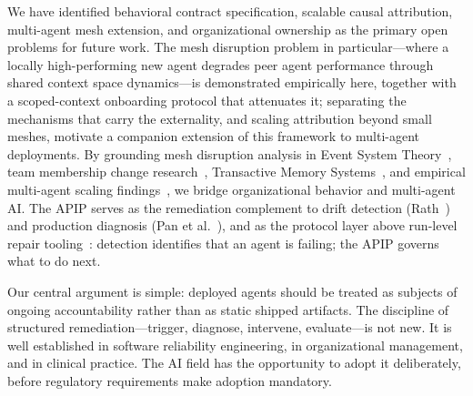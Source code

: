 \documentclass[conference]{IEEEtran}
\begin{document}
We have identified behavioral contract specification, scalable causal
attribution, multi-agent mesh extension, and organizational ownership as the
primary open problems for future work. The mesh disruption problem in
particular---where a locally high-performing new agent degrades peer agent
performance through shared context space dynamics---is demonstrated
empirically here, together with a scoped-context onboarding protocol that
attenuates it; separating the mechanisms that carry the externality, and
scaling attribution beyond small meshes, motivate a companion extension of
this framework to multi-agent deployments. By grounding mesh disruption
analysis in Event
System Theory~\cite{morgeson2015event}, team membership change
research~\cite{summers2012team,trainer2020membership}, Transactive Memory
Systems~\cite{ren2011transactive,wegner1987transactive}, and empirical
multi-agent scaling findings~\cite{kim2025scaling}, we bridge organizational
behavior and multi-agent AI. The APIP serves as the remediation complement to
drift detection (Rath~\cite{rath2026drift}) and production diagnosis (Pan et
al.~\cite{pan2025measuring}), and as the protocol layer above run-level repair
tooling~\cite{zhu2026agentdebugx}: detection identifies that an agent is
failing; the APIP governs what to do next.

Our central argument is simple: deployed agents should be treated as subjects
of ongoing accountability rather than as static shipped artifacts. The
discipline of structured remediation---trigger, diagnose, intervene,
evaluate---is not new. It is well established in software reliability
engineering, in organizational management, and in clinical practice. The AI
field has the opportunity to adopt it deliberately, before regulatory
requirements make adoption mandatory.
\end{document}
